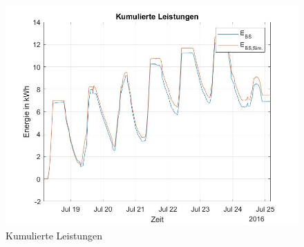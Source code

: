 \begin{figure}[H]
    \centering
    \includegraphics[width=\textwidth]{Abbildungen/kummulierteleistungen.jpg}
    \caption{Kumulierte Leistungen}
    \label{fig:plot1_230730}
\end{figure}


